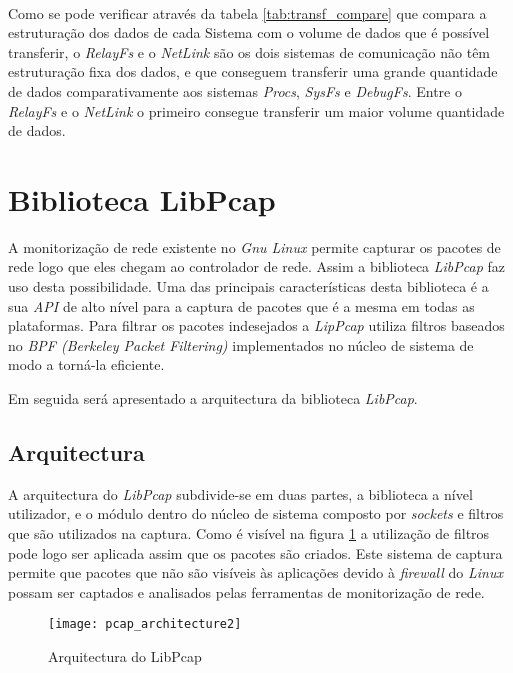 \paragraph*{}
Como se pode verificar através da tabela \ref{tab:transf_compare} que compara a estruturação dos dados de cada Sistema com o volume de dados que é possível transferir, o \textit{RelayFs} e o \textit{NetLink} são os dois sistemas de comunicação não têm estruturação fixa dos dados, e que conseguem transferir uma grande quantidade de dados comparativamente aos sistemas \textit{Procs}, \textit{SysFs} e \textit{DebugFs}.
Entre o \textit{RelayFs} e o \textit{NetLink} o primeiro consegue transferir um maior volume quantidade de dados.

\section{Biblioteca LibPcap}\label{sect:LibPcap}

A monitorização de rede existente no \textit{Gnu Linux} permite capturar os pacotes de rede logo que eles chegam ao controlador de rede.
Assim a biblioteca \textit{LibPcap}\cite{:LibPcap} faz uso desta possibilidade.
Uma das principais características desta biblioteca é a sua \textit{API} de alto nível para a captura de pacotes que é a mesma em todas as plataformas.
Para filtrar os pacotes indesejados a \textit{LipPcap} utiliza filtros baseados no \textit{BPF (Berkeley Packet Filtering)} implementados no núcleo de sistema de modo a torná-la eficiente.

Em seguida será apresentado a arquitectura da biblioteca \textit{LibPcap}.

\subsection {Arquitectura}\label{sect:architecture_libpcap}
A arquitectura do \textit{LibPcap} subdivide-se em duas partes, a biblioteca a nível utilizador, e o módulo dentro do núcleo de sistema composto por \textit{sockets} e filtros que são utilizados na captura.
Como é visível na figura \ref{fig:pcap_architecture} a utilização de filtros pode logo ser aplicada assim que os pacotes são criados.
Este sistema de captura permite que pacotes que não são visíveis às aplicações devido à \textit{firewall} do \textit{Linux} possam ser captados e analisados pelas ferramentas de monitorização de rede.

\begin{figure}[h]
       \centering
       \texttt{[image: pcap\_architecture2]}
       \caption{Arquitectura do LibPcap}
      \label{fig:pcap_architecture}
\end{figure}

